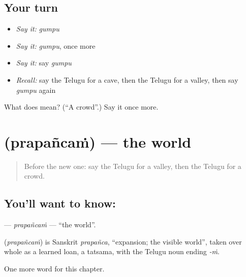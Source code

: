 \subsection*{Your turn}
\begin{itemize}
\raggedright
  \item \emph{Say it:} \emph{gumpu}
  \item \emph{Say it:} \emph{gumpu}, once more
  \item \emph{Say it:} say \emph{gumpu}
  \item \emph{Recall:} say the Telugu for a cave, then the Telugu for a valley, then say \emph{gumpu} again
\end{itemize}

\begin{tcolorbox}[breakable,colback=teal!4,colframe=teal!35!black,title={Before you move on}]
What does  mean? (\textquotedblleft{}A crowd\textquotedblright{}.) Say it once more.
\end{tcolorbox}
\section[\texorpdfstring{\te{ప్రపంచం} (prapañcaṁ)}{ప్రపంచం (prapañcaṁ)}]{ (prapañcaṁ) — the world}

\label{lesson:TE-C175-prapancam}



\begin{quote}
Before the new one: say the Telugu for a valley, then the Telugu for a crowd.
\end{quote}

\subsection*{You'll want to know: }
\textbf{} — \emph{prapañcaṁ} — \textquotedblleft{}the world\textquotedblright{}.

\begin{cousinweb}
\textbf{} (\emph{prapañcaṁ}) is Sanskrit \emph{prapañca}, \textquotedblleft{}expansion; the visible world\textquotedblright{}, taken over whole as a learned loan, a tatsama, with the Telugu noun ending \emph{-ṁ}.
\end{cousinweb}

\begin{grammarlens}[title={What you've built}]
One more word for this chapter.
\end{grammarlens}

